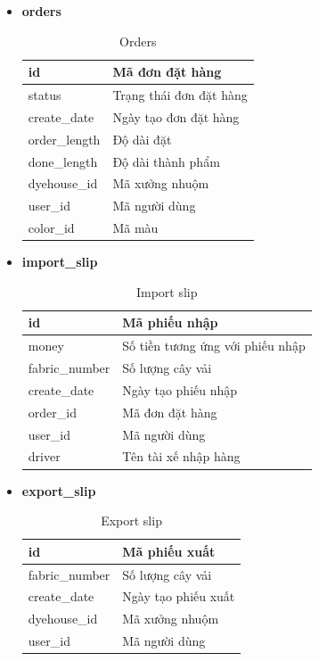 \begin{itemize}
    \item \textbf{orders}
    \begin{table}[H]
        \centering
        \begin{tabular}{|m{3cm}|m{10cm}|}
        \hline 
            id & Mã đơn đặt hàng\\ \hline
            status & Trạng thái đơn đặt hàng \\ \hline
            create\_date & Ngày tạo đơn đặt hàng \\ \hline
            order\_length & Độ dài đặt\\ \hline
            done\_length & Độ dài thành phẩm\\ \hline
            dyehouse\_id & Mã xưởng nhuộm\\ \hline
            user\_id & Mã người dùng\\ \hline
            color\_id & Mã màu\\
        \hline 
        \end{tabular}
        \caption{Orders}
        \label{orders}
    \end{table}
    
    \item \textbf{import\_slip}
    \begin{table}[H]
        \centering
        \begin{tabular}{|m{3cm}|m{10cm}|}
        \hline 
            id & Mã phiếu nhập\\ \hline
            money & Số tiền tương ứng với phiếu nhập \\ \hline
            fabric\_number & Số lượng cây vải\\ \hline
            create\_date & Ngày tạo phiếu nhập \\ \hline
            order\_id & Mã đơn đặt hàng\\ \hline
            user\_id & Mã người dùng\\ \hline
            driver & Tên tài xế nhập hàng\\
        \hline 
        \end{tabular}
        \caption{Import slip}
        \label{import_slip}
    \end{table}
    
    \newpage
    \item \textbf{export\_slip}
    \begin{table}[H]
        \centering
        \begin{tabular}{|m{3cm}|m{10cm}|}
        \hline 
            id & Mã phiếu xuất\\ \hline
            fabric\_number & Số lượng cây vải\\ \hline
            create\_date & Ngày tạo phiếu xuất \\ \hline
            dyehouse\_id & Mã xưởng nhuộm\\ \hline
            user\_id & Mã người dùng\\ 
        \hline 
        \end{tabular}
        \caption{Export slip}
        \label{export_slip}
    \end{table}
    

\end{itemize}
